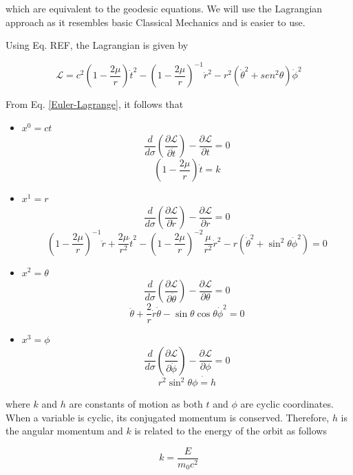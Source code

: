 \documentclass[letterpaper,11pt,onecolumn]{article}
\begin{document}
which are equivalent to the geodesic equations. We will use the Lagrangian approach as it resembles basic Classical Mechanics and is easier to use. 

Using Eq. {\color{red} REF}, the Lagrangian is given by 

\begin{equation} \label{Lagrangian}
    \mathcal{L} = c^{2}\left( 1-\frac{2\mu}{r} \right)\dot{t}^{2}-\left( 1-\frac{2\mu}{r}\right)^{-1}\dot{r}^{2}-r^{2}\left(\dot{\theta}^{2}+sen^{2}\theta\right)\dot{\phi}^{2}
\end{equation}

From Eq. \ref{Euler-Lagrange}, it follows that

\begin{itemize}
    \item $x^0 = ct$
    $$\frac{d}{d\sigma} \left( \frac{\partial \mathcal{L}}{\partial \dot{t}}\right) - \frac{\partial \mathcal{L}}{\partial t} = 0$$  $$\left( 1 - \frac{2 \mu}{r} \right) \dot{t} = k$$
    
    \item $x^1 = r$
    $$\frac{d}{d\sigma} \left( \frac{\partial \mathcal{L}}{\partial \dot{r}}\right) - \frac{\partial \mathcal{L}}{\partial r} = 0 $$
    $$\left( 1 - \frac{2 \mu}{r} \right)^{-1} \ddot{r} + \frac{2\mu}{r^2} \dot{t}^2 - \left( 1 - \frac{2 \mu}{r} \right)^{-2} \frac{\mu}{r^2} \dot{r}^2 - r \left( \dot{\theta}^2 + \sin^2 \theta \dot{\phi}^2  \right) = 0$$
    
    \item $x^2 = \theta$
    $$\frac{d}{d\sigma} \left( \frac{\partial \mathcal{L}}{\partial \dot{\theta}}\right) - \frac{\partial \mathcal{L}}{\partial \theta} = 0 $$
    $$\ddot{\theta} + \frac{2}{r} \dot{r} \dot{\theta} - \sin \theta \cos \theta \dot{\phi}^2 = 0$$
    
    \item $x^3 = \phi$
     $$ \frac{d}{d\sigma} \left( \frac{\partial \mathcal{L}}{\partial \dot{\phi}}\right) - \frac{\partial \mathcal{L}}{\partial \phi} = 0 $$
     $$r^2 \sin^2 \theta \dot{\phi = h }$$
    
\end{itemize}

where $k$ and $h$ are constants of motion as both $t$ and $\phi$ are cyclic coordinates. When a variable is cyclic, its conjugated momentum is conserved. Therefore, $h$ is the angular momentum and  $k$ is related to the energy of the orbit as follows

\begin{equation}
    k = \frac{E}{m_0 c^2}
\end{equation}
\end{document}

